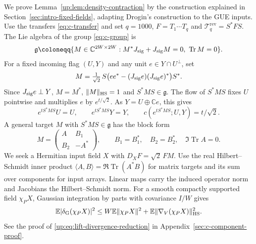 \documentclass[11pt]{article}
\numberwithin{equation}{section}
\theoremstyle{remark}
\newcommand{\E}{\mathbb E}
\newcommand{\C}{\mathbb C}
\newcommand{\Tr}{\operatorname{Tr}}
\begin{document}
We prove Lemma~\ref{up:lem:density-contraction} by the construction
explained in Section~\ref{sec:intro-fixed-fields}, adapting Drogin's
construction \cite[Proposition~4.1, Lemma~4.2 and Proposition~4.4]{Drogin}
to the GUE inputs.
Use the transfers \eqref{eq:c-transfer} and set $q=1000$,
$F=T_1\cdots T_q$ and $\mathcal T_q^{\mathrm{rev}}=S^*FS$.
The Lie algebra of the group \eqref{eq:c-group} is
\begin{equation}\label{up:eq:lie-algebra}
 \mathfrak g\coloneqq
 \{M\in\C^{2W\times2W}:M^*J_{\rm sig}+J_{\rm sig}M=0,\ \Tr M=0\}.
\end{equation}
For a fixed incoming flag $(U,Y)$ and any unit $e\in Y\cap U^\perp$, set
\[
 M=\tfrac1{\sqrt2}\,S\bigl(ee^*-(J_{\rm sig}e)(J_{\rm sig}e)^*\bigr)S^*.
\]
Since $J_{\rm sig}e\perp Y$, $M=M^*$, $\|M\|_{\rm HS}=1$ and
$S^*MS\in\mathfrak g$. The flow of $S^*MS$ fixes $U$ pointwise and
multiplies $e$ by $e^{t/\sqrt2}$. As $Y=U\oplus\C e$, this gives
\begin{equation}\label{up:eq:lift-flag-flow}
 e^{tS^*MS}U=U,\qquad e^{tS^*MS}Y=Y,\qquad
 c(e^{tS^*MS};U,Y)=t/\sqrt2.
\end{equation}
A general target $M$ with $S^*MS\in\mathfrak g$ has the block form
\begin{equation}\label{eq:c-Lie}
 M=\begin{pmatrix}A&B_1\\B_2&-A^*\end{pmatrix},\qquad
 B_1=B_1^*,\quad B_2=B_2^*,\quad\Im\Tr A=0.
\end{equation}
We seek a Hermitian input field $X$ with $D_XF=\sqrt2\,FM$.
Use the real Hilbert--Schmidt inner product
$\langle A,B\rangle=\Re\Tr(A^*B)$ for matrix targets and its sum over
components for input arrays. Linear maps carry the induced operator
norm and Jacobians the Hilbert--Schmidt norm. For a smooth compactly
supported field $\chi_P X$, Gaussian integration by parts with covariance
$I/W$ gives
\begin{equation}\label{up:eq:lift-divergence-reduction}
 \E|\delta_{\rm G}(\chi_P X)|^2
 \le W\E\|\chi_P X\|^2
      +\E\|\nabla_V(\chi_P X)\|_{\rm HS}^2.
\end{equation}
See the proof of \eqref{up:eq:lift-divergence-reduction} in
Appendix~\ref{sec:c-component-proof}.
\end{document}
